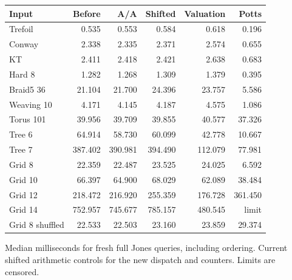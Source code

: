 \begin{center}\small
\begin{tabular}{@{}lrrrrr@{}}
\toprule
Input & Before & A/A & Shifted & Valuation & Potts \\
\midrule
Trefoil & 0.535 & 0.553 & 0.584 & 0.618 & 0.196 \\
Conway & 2.338 & 2.335 & 2.371 & 2.574 & 0.655 \\
KT & 2.411 & 2.418 & 2.421 & 2.638 & 0.683 \\
Hard 8 & 1.282 & 1.268 & 1.309 & 1.379 & 0.395 \\
Braid5 36 & 21.104 & 21.700 & 24.396 & 23.757 & 5.586 \\
Weaving 10 & 4.171 & 4.145 & 4.187 & 4.575 & 1.086 \\
Torus 101 & 39.956 & 39.709 & 39.855 & 40.577 & 37.326 \\
Tree 6 & 64.914 & 58.730 & 60.099 & 42.778 & 10.667 \\
Tree 7 & 387.402 & 390.981 & 394.490 & 112.079 & 77.981 \\
Grid 8 & 22.359 & 22.487 & 23.525 & 24.025 & 6.592 \\
Grid 10 & 66.397 & 64.900 & 68.029 & 62.089 & 38.484 \\
Grid 12 & 218.472 & 216.920 & 255.359 & 176.728 & 361.450 \\
Grid 14 & 752.957 & 745.677 & 785.157 & 480.545 & limit \\
Grid 8 shuffled & 22.533 & 22.503 & 23.160 & 23.859 & 29.374 \\
\bottomrule
\end{tabular}
\end{center}
Median milliseconds for fresh full Jones queries, including ordering. Current shifted arithmetic controls for the new dispatch and counters. Limits are censored.
